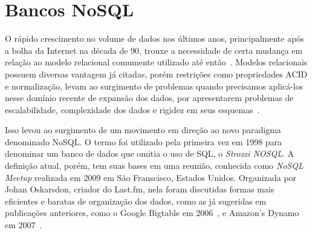 \section{Bancos NoSQL}
    O rápido crescimento no volume de dados nos últimos anos, principalmente após a bolha da Internet na década de 90, trouxe a necessidade de certa mudança em relação ao modelo relacional comumente utilizado até então~\cite{pramod}. Modelos relacionais possuem diversas vantagem já citadas, porém restrições como propriedades ACID e normalização, levam ao surgimento de problemas quando precisamos aplicá-los nesse domínio recente de expansão dos dados, por apresentarem problemas de escalabilidade, complexidade dos dados e rigidez em seus esquemas~\cite{leavitt2010nosql}. 
    
    Isso levou ao surgimento de um movimento em direção ao novo paradigma denominado NoSQL. O termo foi utilizado pela primeira vez em 1998 para denominar um banco de dados que omitia o uso de SQL, o \emph{Strozzi NOSQL}. A definição atual, porém, tem suas bases em uma reunião, conhecida como \emph{NoSQL Meetup} realizada em 2009 em São Franscisco, Estados Unidos. Organizada por Johan Oskarsdon, criador do Last.fm, nela foram discutidas formas mais eficientes e baratas de organização dos dados, como as já sugeridas em publicações anteriores, como o Google Bigtable em 2006~\cite{bigtable}, e Amazon's Dynamo em 2007~\cite{dynamo, chrisnosql}.
